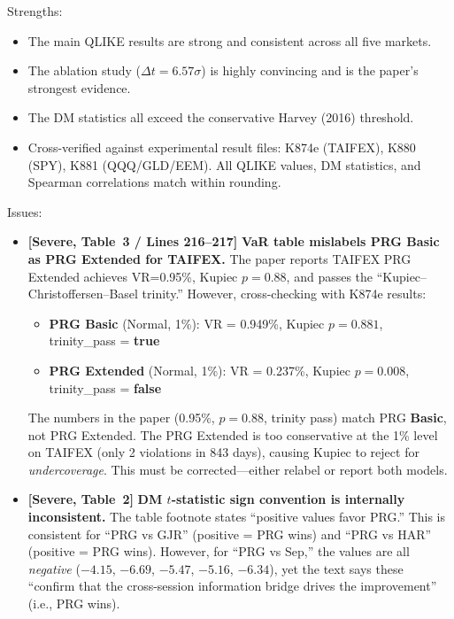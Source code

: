\documentclass[12pt,a4paper]{article}
\begin{document}
\noindent \textcolor{okgreen}{Strengths:}
\begin{itemize}[nosep]
\item The main QLIKE results are strong and consistent across all five markets.
\item The ablation study ($\Delta t = 6.57\sigma$) is highly convincing and is the paper's strongest evidence.
\item The DM statistics all exceed the conservative Harvey (2016) threshold.
\item Cross-verified against experimental result files: K874e (TAIFEX), K880 (SPY), K881 (QQQ/GLD/EEM). All QLIKE values, DM statistics, and Spearman correlations match within rounding.
\end{itemize}

\noindent \textcolor{errorred}{Issues:}
\begin{itemize}[nosep]

\item [\textcolor{errorred}{S3}] \textbf{[Severe, Table~3 / Lines 216--217]} \textbf{VaR table mislabels PRG Basic as PRG Extended for TAIFEX.} The paper reports TAIFEX PRG Extended achieves VR=0.95\%, Kupiec $p=0.88$, and passes the ``Kupiec--Christoffersen--Basel trinity.'' However, cross-checking with K874e results:
  \begin{itemize}[nosep]
  \item \textbf{PRG Basic} (Normal, 1\%): VR = 0.949\%, Kupiec $p = 0.881$, trinity\_pass = \textbf{true}
  \item \textbf{PRG Extended} (Normal, 1\%): VR = 0.237\%, Kupiec $p = 0.008$, trinity\_pass = \textbf{false}
  \end{itemize}
  The numbers in the paper (0.95\%, $p=0.88$, trinity pass) match PRG \textbf{Basic}, not PRG Extended. The PRG Extended is too conservative at the 1\% level on TAIFEX (only 2 violations in 843 days), causing Kupiec to reject for \emph{undercoverage}. This must be corrected---either relabel or report both models.

\item [\textcolor{errorred}{S4}] \textbf{[Severe, Table~2]} \textbf{DM $t$-statistic sign convention is internally inconsistent.} The table footnote states ``positive values favor PRG.'' This is consistent for ``PRG vs GJR'' (positive = PRG wins) and ``PRG vs HAR'' (positive = PRG wins). However, for ``PRG vs Sep,'' the values are all \emph{negative} ($-4.15$, $-6.69$, $-5.47$, $-5.16$, $-6.34$), yet the text says these ``confirm that the cross-session information bridge drives the improvement'' (i.e., PRG wins).


\end{itemize}
\end{document}
